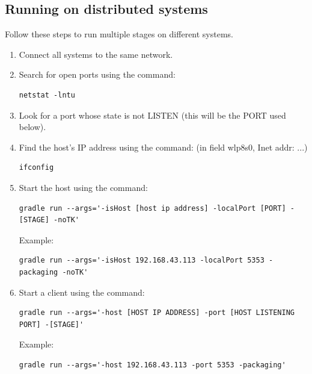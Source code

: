\documentclass[11pt, a4paper]{article}
\begin{document}
\subsection{Running on distributed systems}
Follow these steps to run multiple stages on different systems.
\begin{enumerate}
	\item Connect all systems to the same network.
	\item Search for open ports using the command:
\begin{verbatim}
netstat -lntu
\end{verbatim}
	\item Look for a port whose state is not LISTEN (this will be the PORT used below).
	\item Find the host's IP address using the command: (in field wlp8s0, Inet addr: ...)
\begin{verbatim}
ifconfig
\end{verbatim}
	\item Start the host using the command:
\begin{verbatim}
gradle run --args='-isHost [host ip address] -localPort [PORT] -[STAGE] -noTK'
\end{verbatim}
Example:
\begin{verbatim}
gradle run --args='-isHost 192.168.43.113 -localPort 5353 -packaging -noTK'
\end{verbatim}

	\item Start a client using the command:
\begin{verbatim}
gradle run --args='-host [HOST IP ADDRESS] -port [HOST LISTENING PORT] -[STAGE]'
\end{verbatim}
Example:
\begin{verbatim}
gradle run --args='-host 192.168.43.113 -port 5353 -packaging'
\end{verbatim}
\end{enumerate}
\end{document}
